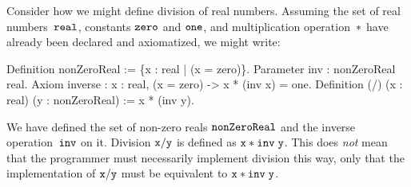 Consider how we might define division of real numbers. Assuming the
set of real numbers~$\mathtt{real}$, constants $\mathtt{zero}$ and $\mathtt{one}$, and
multiplication operation~$\mathtt{*}$ have already been declared and
axiomatized, we might write:
%
\begin{source}
Definition nonZeroReal := \{x : real | \iNot (x = zero)\}.
Parameter inv : nonZeroReal \iTo real.
Axiom inverse : \iForall x : real, \iNot (x = zero) -> x * (inv x) = one.
Definition (/) (x : real) (y : nonZeroReal) := x * (inv y).
\end{source}
%
We have defined the set of non-zero reals $\mathtt{nonZeroReal}$ and
the inverse operation~$\mathtt{inv}$ on it. Division $\mathtt{x/y}$ is defined
as $\mathtt{x * inv\; y}$. This does \emph{not} mean that the
programmer must necessarily implement division this way, only that the
implementation of $\mathtt{x/y}$ must be equivalent to $\mathtt{x * inv\;y}$.


